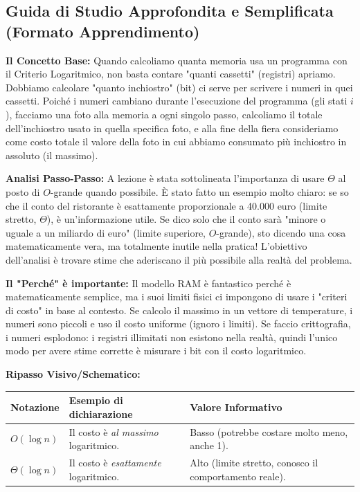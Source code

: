 \documentclass[a4paper, 11pt]{report}
\begin{document}
\vspace{0.5cm}
\subsection*{Guida di Studio Approfondita e Semplificata (Formato Apprendimento)}
\textbf{Il Concetto Base:}
Quando calcoliamo quanta memoria usa un programma con il Criterio Logaritmico, non basta contare "quanti cassetti" (registri) apriamo. Dobbiamo calcolare "quanto inchiostro" (bit) ci serve per scrivere i numeri in quei cassetti. Poiché i numeri cambiano durante l'esecuzione del programma (gli stati $i$), facciamo una foto alla memoria a ogni singolo passo, calcoliamo il totale dell'inchiostro usato in quella specifica foto, e alla fine della fiera consideriamo come costo totale il valore della foto in cui abbiamo consumato più inchiostro in assoluto (il massimo).

\textbf{Analisi Passo-Passo:}
A lezione è stata sottolineata l'importanza di usare $\Theta$ al posto di $O$-grande quando possibile. È stato fatto un esempio molto chiaro: se so che il conto del ristorante è esattamente proporzionale a 40.000 euro (limite stretto, $\Theta$), è un'informazione utile. Se dico solo che il conto sarà "minore o uguale a un miliardo di euro" (limite superiore, $O$-grande), sto dicendo una cosa matematicamente vera, ma totalmente inutile nella pratica! L'obiettivo dell'analisi è trovare stime che aderiscano il più possibile alla realtà del problema.

\textbf{Il "Perché" è importante:}
Il modello RAM è fantastico perché è matematicamente semplice, ma i suoi limiti fisici ci impongono di usare i "criteri di costo" in base al contesto. Se calcolo il massimo in un vettore di temperature, i numeri sono piccoli e uso il costo uniforme (ignoro i limiti). Se faccio crittografia, i numeri esplodono: i registri illimitati non esistono nella realtà, quindi l'unico modo per avere stime corrette è misurare i bit con il costo logaritmico.

\textbf{Ripasso Visivo/Schematico:}
\begin{center}
\begin{tabular}{|l|p{6cm}|p{6cm}|}
\hline
\textbf{Notazione} & \textbf{Esempio di dichiarazione} & \textbf{Valore Informativo} \\
\hline
$O(\log n)$ & Il costo è \textit{al massimo} logaritmico. & Basso (potrebbe costare molto meno, anche 1). \\
\hline
$\Theta(\log n)$ & Il costo è \textit{esattamente} logaritmico. & Alto (limite stretto, conosco il comportamento reale). \\
\hline
\end{tabular}
\end{center}
\end{document}
